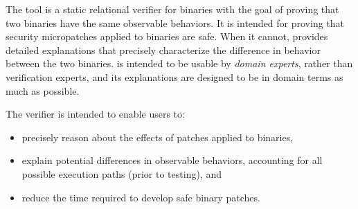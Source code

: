 The \TOOL{} tool is a static relational verifier for binaries with the goal of proving that two binaries have the same observable behaviors. %
It is intended for proving that security micropatches applied to binaries are safe. %
When it cannot, \TOOL{} provides detailed explanations that precisely characterize the difference in behavior between the two binaries. %
\TOOL{} is intended to be usable by \emph{domain experts}, rather than verification experts, and its explanations are designed to be in domain terms as much as possible. %

The \TOOL{} verifier is intended to enable users to: %
\begin{itemize}
\item precisely reason about the effects of patches applied to binaries,
\item explain potential differences in observable behaviors, accounting for all possible execution paths (prior to testing), and
\item reduce the time required to develop safe binary patches.
\end{itemize}

